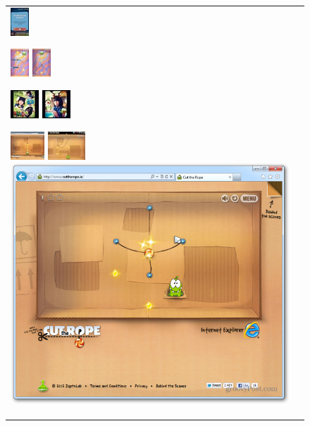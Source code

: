 \begin{figure}
\begin{tabular}{p{}p{}}
\begin{thumbsequence}
		\includegraphics[height=\thumbheight]{ropes/looseduplicate13.jpg}
	\end{thumbsequence}
	\begin{thumbsequence}
		\includegraphics[height=\thumbheight]{ropes/looseduplicate14.jpg}
		\includegraphics[height=\thumbheight]{ropes/looseduplicate15.jpg}
	\end{thumbsequence}
	\begin{thumbsequence}
		\includegraphics[height=\thumbheight]{ropes/looseduplicate10.jpg}
		\includegraphics[height=\thumbheight]{ropes/looseduplicate11.jpg}
	\end{thumbsequence}
	\newstrip
	\begin{thumbsequence}
		\includegraphics[height=\thumbheight]{ropes/looseduplicate1.jpg}
		\includegraphics[height=\thumbheight]{ropes/looseduplicate2.jpg}
		\includegraphics[height=\thumbheight]{ropes/looseduplicate3.png}

\end{thumbsequence}
\end{tabular}
\end{figure}

